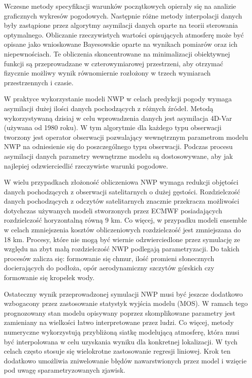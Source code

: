 Wczesne metody specyfikacji warunków początkowych opierały się na analizie graficznych wykresów 
pogodowych. Następnie różne metody interpolacji danych były zastąpione przez algorytmy
asymilacji danych oparte na teorii sterowania optymalnego. Obliczanie rzeczywistych wartości
opisujących atmosferę może być opisane jako wnioskowane Bayesowskie oparte na wynikach pomiarów
oraz ich niepewnościach. Te obliczenia skoncentrowane na minimalizacji obiektywnej funkcji 
są przeprowadzane w czterowymiarowej przestrzeni, aby otrzymać fizycznie możliwy wynik
równomiernie rozłożony w trzech wymiarach przestrzennych i czasie.

W praktyce wykorzystanie modeli NWP w celach predykcji pogody wymaga asymilacji dużej ilości
danych pochodzących z różnych źródeł. Metodą wykorzystywaną dzisiaj w celu wprowadzenia
danych jest asymilacja 4D-Var (używana od 1980 roku). W tym algorytmie dla każdego typu obserwacji tworzony jest
operator obserwacji pozwalający wewnętrznym parametrom modelu NWP na odniesienie się
do poszczególnego typu obserwacji. Podczas procesu asymilacji danych parametry wewnętrzne
modelu są dostosowywane, aby jak najlepiej odzwierciedlić rzeczywiste warunki pogodowe.

W wielu przypadkach złożoność obliczeniowa NWP wymaga redukcji objętości danych pochodzących
z obserwacji satelitarnych o dużej gęstości. Rozdzielczość danych pochodzących z odczytów
satelitarnych znacznie przekracza możliwości dotychczas używanych modeli stworzonych przez
ECMWF posiadających rozdzielczość horyzontalną równą 9 km. Co więcej, w przypadku modeli
ensemble w celach zmniejszenia kosztów obliczeniowych rozdzielczość jest zmniejszana do 18 km.
Procesy, które nie mogą być wiernie odzwierciedlone przez symulację
ze względu na zbyt małą rozdzielczość NWP podlegają parametryzacji.
Do takich procesów zalicza się: formowanie się chmur, ilość promieni słonecznych docierających do 
podłoża, opór aerodynamiczny szczytów górskich czy formowanie się kropelek wody.

Ostateczny wynik przeprowadzonej symulacji NWP musi być jeszcze dodatkowo wzbogacony przez zastosowanie
statystyk wyjścia modelu (MOS). W ramach tego prognozowany stan modelu opisywany poprzez skomplikowane
parametry jest zamieniany na wielkości łatwo interpretowane przez ludzi. Co więcej, metody numeryczne
wykorzystują przybliżoną siatkę modelującą atmosferę, która musi być interpolowana w celu uzyskania
wyniku dla konkretnej lokalizacji. W tych celach często stosuje się wielokrotne zastosowanie 
regresji liniowej. Krok ten dodatkowo umożliwia zniwelowanie błędów nawarstwionych przez model i wzięcie
pod uwagę sparametryzowanych zjawisk.

